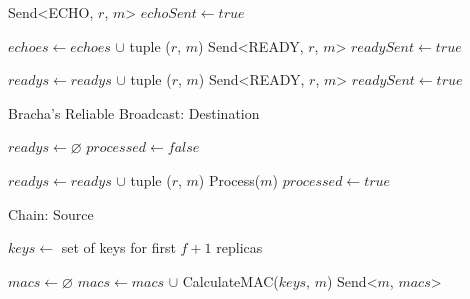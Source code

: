 {\begin{algorithm}
\begin{algorithmic}[1]
					\State Send<ECHO, $r$, $m$>
				\EndFor
				\State $echoSent \gets true$
			\EndIf
		\EndFunction
		\State
		
				\State $echoes \gets echoes$ $\cup$ tuple ($r$, $m$)
						\State Send<READY, $r$, $m$>
					\EndFor
					\State $readySent \gets true$
				\EndIf
			\EndIf
		\EndFunction
		\State
		
				\State $readys \gets readys$ $\cup$ tuple ($r$, $m$)
						\State Send<READY, $r$, $m$>
					\EndFor
					\State $readySent \gets true$
				\EndIf
			\EndIf
		\EndFunction
	\end{algorithmic}
\end{algorithm}

\begin{algorithm}
	\caption{Bracha's Reliable Broadcast: Destination}\label{brb3}
	\begin{algorithmic}[1]
			\State $readys \gets \varnothing$
			\State $processed \gets false$
		\EndFunction
		\State
		
				\State $readys \gets readys$ $\cup$ tuple ($r$, $m$)
					\State Process($m$)
					\State $processed \gets true$
				\EndIf
			\EndIf
		\EndFunction
	\end{algorithmic}
\end{algorithm}

\begin{algorithm}
	\caption{Chain: Source}\label{chain1}
	\begin{algorithmic}[1]
			\State $keys \gets$ set of keys for first $f + 1$ replicas
		\EndFunction
		\State
		
			\State $macs \gets \varnothing$
				\State $macs \gets macs$ $\cup$ CalculateMAC($keys$, $m$)
			\EndFor
			\State Send<$m$, $macs$>
		\EndFunction
	\end{algorithmic}
\end{algorithm}

}
